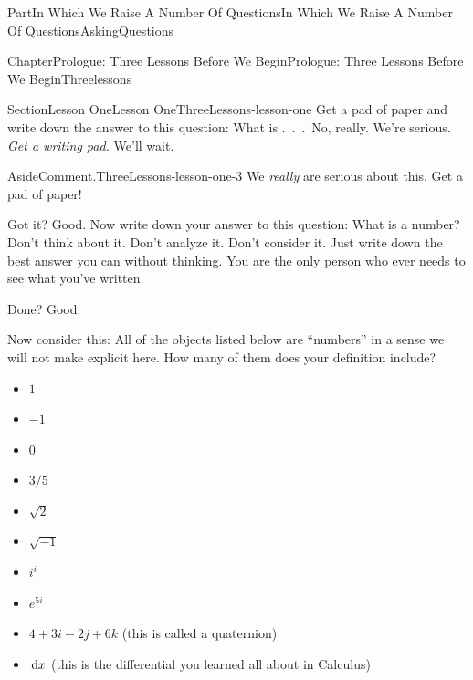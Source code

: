 \documentclass[oneside,10pt,]{book}
\numberwithin{equation}{part}
\newcommand{\dx}[1]{\,{\rm d}#1}
\begin{document}
\begin{partptx}{Part}{In Which We Raise A Number Of Questions}{}{In Which We Raise A Number Of Questions}{}{}{AskingQuestions}
\renewcommand*{\partname}{Part}
%
%
\typeout{************************************************}
\typeout{************************************************}
%
\begin{chapterptx}{Chapter}{Prologue: Three Lessons Before We Begin}{}{Prologue: Three Lessons Before We Begin}{}{}{Threelessons}
\renewcommand*{\chaptername}{Chapter}
%
%
\typeout{************************************************}
\typeout{************************************************}
%
\begin{sectionptx}{Section}{Lesson One}{}{Lesson One}{}{}{ThreeLessons-lesson-one}
Get a pad of paper and write down the answer to this question: What is .~.~.~No, really.  We're serious. \emph{Get a writing pad.} We'll wait.%
\begin{aside}{Aside}{Comment.}{ThreeLessons-lesson-one-3}%
We \emph{really} are serious about this.  Get a pad of paper!%
\end{aside}
Got it?  Good. Now write down your answer to this question: What is a number?  Don't think about it.  Don't analyze it. Don't consider it.  Just write down the best answer you can without thinking.  You are the only person who ever needs to see what you've written.%
\par
Done?  Good.%
\par
Now consider this: All of the objects listed below are ``numbers'' in a sense we will not make explicit here.  How many of them does your definition include?%
\par
%
\begin{itemize}[label=\textbullet]
\item{}\(\displaystyle 1\)%
\item{}\(\displaystyle -1\)%
\item{}\(\displaystyle 0\)%
\item{}\(\displaystyle 3/5\)%
\item{}\(\displaystyle \sqrt{2}\)%
\item{}\(\displaystyle \sqrt{-1}\)%
\item{}\(\displaystyle i^i\)%
\item{}\(\displaystyle e^{5i}\)%
\item{}\(4+3i-2j+6k\) (this is called a quaternion)%
\item{}\(\dx{x}\) (this is the differential you learned all about in Calculus)%

\end{itemize}
\end{sectionptx}
\end{chapterptx}
\end{partptx}
\end{document}
